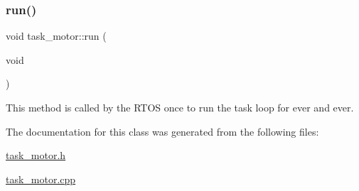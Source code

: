 \mbox{\label{classtask__motor_a895a075ec470c9d5a07b8959de06aacd}} 
\subsubsection{\texorpdfstring{run()}{run()}}
{\footnotesize\ttfamily void task\+\_\+motor\+::run (\begin{DoxyParamCaption}\item[{void}]{ }\end{DoxyParamCaption})}

This method is called by the R\+T\+OS once to run the task loop for ever and ever. 

The documentation for this class was generated from the following files\+:\begin{DoxyCompactItemize}
\item 
\mbox{\hyperlink{task__motor_8h}{task\+\_\+motor.\+h}}\item 
\mbox{\hyperlink{task__motor_8cpp}{task\+\_\+motor.\+cpp}}\end{DoxyCompactItemize}
